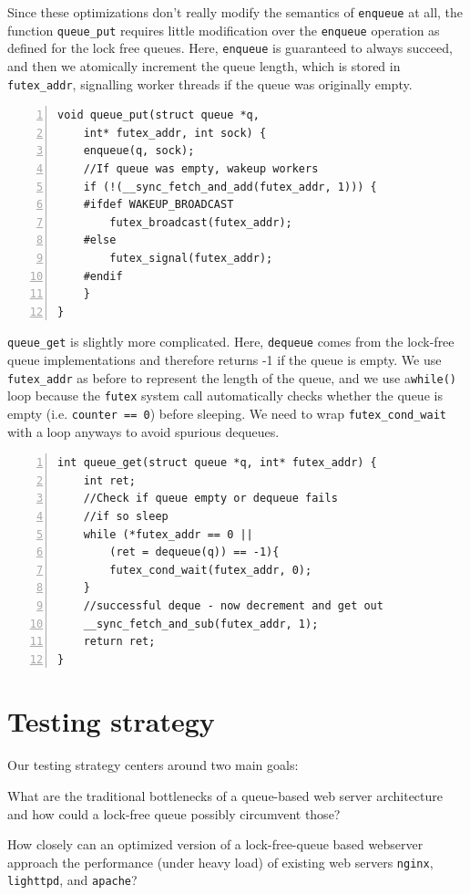 \documentclass[twoside,10pt]{article}
\begin{document}
\begin{multicols}{2}
Since these optimizations don't really modify the semantics of \verb+enqueue+
at all, the function \verb+queue_put+ requires little modification over 
the \verb+enqueue+ operation as defined for the lock free queues. Here, \verb+enqueue+ is guaranteed to always succeed, and then we atomically increment the queue length, which is stored in \verb+futex_addr+, signalling worker threads if the queue was originally empty.   
\begin{Verbatim}[numbers=left,
                 fontsize=\small]
void queue_put(struct queue *q, 
    int* futex_addr, int sock) {
    enqueue(q, sock); 	
    //If queue was empty, wakeup workers 
    if (!(__sync_fetch_and_add(futex_addr, 1))) {
    #ifdef WAKEUP_BROADCAST
        futex_broadcast(futex_addr); 
    #else 
        futex_signal(futex_addr); 
    #endif 
    }
}
\end{Verbatim}

\verb+queue_get+ is slightly more complicated. Here, \verb+dequeue+
comes from the lock-free queue implementations and therefore returns -1 if the
queue is empty. We use \verb+futex_addr+ as before to represent the length of the queue, and we use a\verb+while()+ loop
because the \verb+futex+ system call automatically checks whether the
queue is empty (i.e.  \verb+counter == 0+) before sleeping. We need to
wrap \verb+futex_cond_wait+ with a loop anyways to avoid spurious dequeues.


\begin{Verbatim}[numbers=left,
                 fontsize=\small]
int queue_get(struct queue *q, int* futex_addr) {
    int ret;
    //Check if queue empty or dequeue fails
    //if so sleep  
    while (*futex_addr == 0 || 
        (ret = dequeue(q)) == -1){
        futex_cond_wait(futex_addr, 0);
    }
    //successful deque - now decrement and get out 
    __sync_fetch_and_sub(futex_addr, 1);
    return ret; 
}
\end{Verbatim}

\section{Testing strategy}

Our testing strategy centers around two main goals:

\begin{compactitem}
\item What are the traditional bottlenecks of a queue-based web server
  architecture and how could a lock-free queue possibly circumvent
  those?
\item How closely can an optimized version of a lock-free-queue based
  webserver approach the performance (under heavy load) of existing
  web servers \verb+nginx+, \verb+lighttpd+, and \verb+apache+?
\end{compactitem}


\end{multicols}
\end{document}
